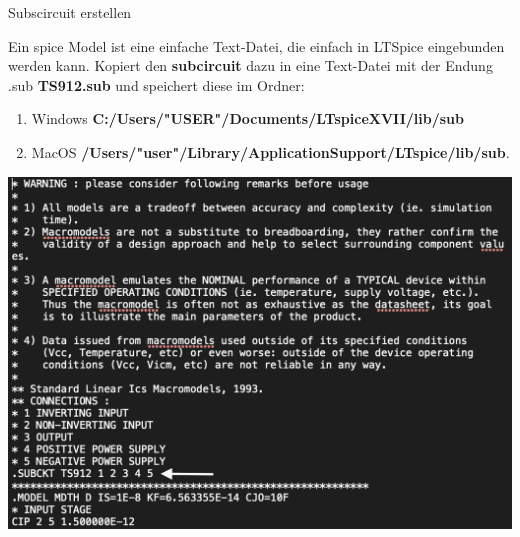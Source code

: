 \begin{frame}[t]{Subscircuit erstellen}

    Ein spice Model ist eine einfache Text-Datei, die einfach in LTSpice eingebunden werden kann.
    Kopiert den \textbf{subcircuit} dazu in eine Text-Datei mit der Endung .sub \textbf{TS912.sub} und speichert diese im Ordner:

    \begin{scriptsize}
        \begin{enumerate}
            \item Windows \textbf{C:/Users/"USER"/Documents/LTspiceXVII/lib/sub}
            \item MacOS \textbf{/Users/"user"/Library/ApplicationSupport/LTspice/lib/sub}.
        \end{enumerate}
    \end{scriptsize}

    \begin{spacing}{0.9} \begin{tiny}
            \begin{minipage}{\textwidth}
                \includegraphics[width=0.5\linewidth]{pictures/spice_model.png}
            \end{minipage}
        \end{tiny} \end{spacing}
\end{frame}

